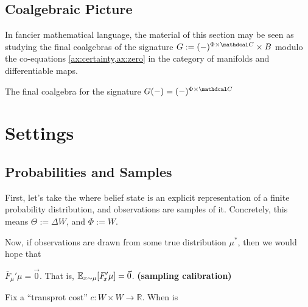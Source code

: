 \documentclass{article}
\def\confdom{\mathdcal C}
\begin{document}
\subsection{Coalgebraic Picture}


In fancier mathematical language, the material of this section may be seen as studying the final coalgebras of the signature 
$
	G := (-)^{\Phi \times \confdom} \times B
$
modulo the co-equations \cref{ax:certainty,ax:zero} in the category of manifolds and differentiable maps.


\begin{prop}
	The final coalgebra for the signature $G(-) = (-)^{\Phi \times \confdom}$
\end{prop}


\section{Settings}
\subsection{Probabilities and Samples}

First, let's take the where belief state is an explicit representation of a finite probability distribution, and observations are samples of it. 
Concretely, this means $\Theta := \Delta W$, and $\Phi := W$. 

Now, if observations are drawn from some true distribution $\mu^*$, then we would hope that 

\begin{CFaxioms}
	\item  $\bar F_{\!\mu}'\mu = \vec 0$. 
	That is, $\operatorname*{\mathbb{E}}_{x \sim \mu}[ F'_{\!x}\mu] = \vec 0$.
	\hfill \textbf{(sampling calibration)} \label{ax:sample-calibration}
\end{CFaxioms}

\begin{computation}
    Fix a ``transprot cost'' $c : W\times W \to \mathbb R$. 
    When is 
    \tcblower
\end{computation}
\end{document}
